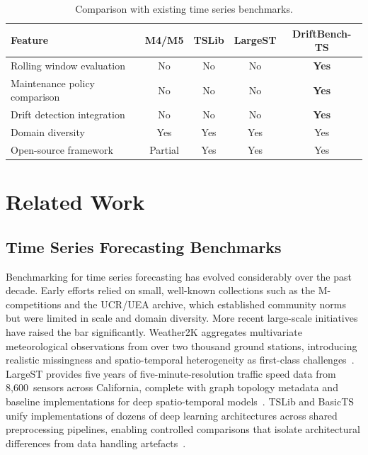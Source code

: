 \documentclass[conference]{IEEEtran}
\begin{document}
\begin{table}[t]
	\centering
	\caption{Comparison with existing time series benchmarks.}
	\label{tab:novelty}
	\begin{tabular}{lcccc}
		\toprule
		Feature                       & M4/M5   & TSLib & LargeST & \textbf{DriftBench-TS} \\
		\midrule
		Rolling window evaluation     & No      & No    & No      & \textbf{Yes}           \\
		Maintenance policy comparison & No      & No    & No      & \textbf{Yes}           \\
		Drift detection integration   & No      & No    & No      & \textbf{Yes}           \\
		Domain diversity              & Yes     & Yes   & Yes     & Yes                    \\
		Open-source framework         & Partial & Yes   & Yes     & Yes                    \\
		\bottomrule
	\end{tabular}
\end{table}

\section{Related Work}

\subsection{Time Series Forecasting Benchmarks}\label{sec:related_benchmarks}

Benchmarking for time series forecasting has evolved considerably
over the past decade. Early efforts relied on small, well-known
collections such as the M-competitions and the UCR/UEA archive, which
established community norms but were limited in scale and domain
diversity. More recent large-scale initiatives have raised the bar
significantly. Weather2K aggregates multivariate meteorological
observations from over two thousand ground stations, introducing
realistic missingness and spatio-temporal heterogeneity as first-class
challenges~\cite{zhu2023weather2k}. LargeST provides five years of
five-minute-resolution traffic speed data from 8,600~sensors across
California, complete with graph topology metadata and baseline
implementations for deep spatio-temporal
models~\cite{liuxu2023largest}. TSLib and BasicTS unify
implementations of dozens of deep learning architectures across shared
preprocessing pipelines, enabling controlled comparisons that isolate
architectural differences from data handling
artefacts~\cite{tslib, deep_time_series_survey}.
\end{document}
